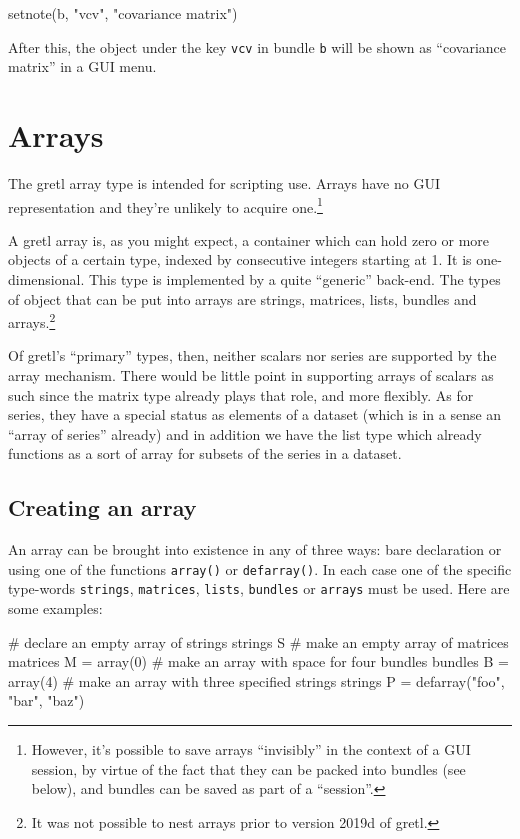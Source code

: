 \begin{code}
setnote(b, "vcv", "covariance matrix")
\end{code}

After this, the object under the key \texttt{vcv} in bundle \texttt{b}
will be shown as ``covariance matrix'' in a GUI menu.

\section{Arrays}
\label{sec:arrays}

The gretl array type is intended for scripting use. Arrays have no GUI
representation and they're unlikely to acquire one.\footnote{However,
  it's possible to save arrays ``invisibly'' in the context of a GUI
  session, by virtue of the fact that they can be packed into bundles
  (see below), and bundles can be saved as part of a ``session''.}

A gretl array is, as you might expect, a container which can hold zero
or more objects of a certain type, indexed by consecutive integers
starting at 1. It is one-dimensional. This type is implemented by a
quite ``generic'' back-end. The types of object that can be put into
arrays are strings, matrices, lists, bundles and arrays.\footnote{It
  was not possible to nest arrays prior to version 2019d of gretl.}

Of gretl's ``primary'' types, then, neither scalars nor series are
supported by the array mechanism. There would be little point in
supporting arrays of scalars as such since the matrix type already
plays that role, and more flexibly. As for series, they have a special
status as elements of a dataset (which is in a sense an ``array of
series'' already) and in addition we have the list type which already
functions as a sort of array for subsets of the series in a dataset.

\subsection{Creating an array}

An array can be brought into existence in any of three ways: bare
declaration or using one of the functions \texttt{array()} or
\texttt{defarray()}. In each case one of the specific type-words
\texttt{strings}, \texttt{matrices}, \texttt{lists}, \texttt{bundles}
or \texttt{arrays} must be used. Here are some examples:

\begin{code}
# declare an empty array of strings
strings S
# make an empty array of matrices
matrices M = array(0)
# make an array with space for four bundles
bundles B = array(4)
# make an array with three specified strings
strings P = defarray("foo", "bar", "baz")
\end{code}

